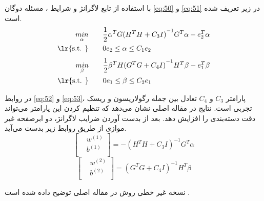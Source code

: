 با استفاده از تابع لاگرانژ و شرایط ، مسئله دوگان \ref{eq:50} و \ref{eq:51} در زیر تعریف شده است. 
\begin{equation}
\begin{split}
\mathop{{ min}}\limits_{\alpha} \qquad & \frac{1}{2}{{\alpha }^{T}}G{{({{H}^{T}}H + C_{3}I)}^{-1}}{{G}^{T}}\alpha -e_{2}^{T}\alpha  \\
\textrm{\lr{s.t. }} \qquad & 0{{e}_{2}}\le \alpha \le {{C}_{1}}{{e}_{2}}
\end{split}
\label{eq:52}
\end{equation}
\begin{equation}
\begin{split}
\mathop{{ min}}\limits_{\beta} \qquad & \frac{1}{2}{{\beta }^{T}}H{{({{G}^{T}}G + C_{4}I)}^{-1}}{{H}^{T}}\beta -e_{1}^{T}\beta  \\
\textrm{\lr{s.t. }} \qquad & 0{{e}_{1}}\le \beta \le {{C}_{2}}{{e}_{1}}
\end{split}
\label{eq:53}
\end{equation}

در روابط \ref{eq:52} و \ref{eq:53}، پارامتر  $C_3$ و  $C_4$ تعادل بین جمله رگولاریسون و ریسک تجربی است. نتایج در مقاله اصلی \cite{shao2011} نشان می‌دهد که تنظیم کردن این پارامتر می‌تواند دقت دسته‌بندی را افزایش دهد. بعد از بدست آوردن ضرایب لاگرانژ، دو ابرصفحه غیر موازی از طریق روابط زیر بدست می‌آید.
\begin{equation}
\left[ \begin{aligned}
& {{w}^{(1)}} \\
& {{b}^{(1)}} \\
\end{aligned}\right]= -{{({{H}^{T}}H+C_{3}I)}^{-1}}{{G}^{T}}\alpha
\label{eq:54}
\end{equation}
\begin{equation}
\left[ \begin{aligned}
& {{w}^{(2)}} \\
& {{b}^{(2)}} \\
\end{aligned}\right]= {{({{G}^{T}}G + C_{4}I)}^{-1}}{{H}^{T}}\beta
\label{eq:55}
\end{equation}

نسخه غیر خطی روش  در مقاله اصلی توضیح داده شده است \cite{shao2011}.

